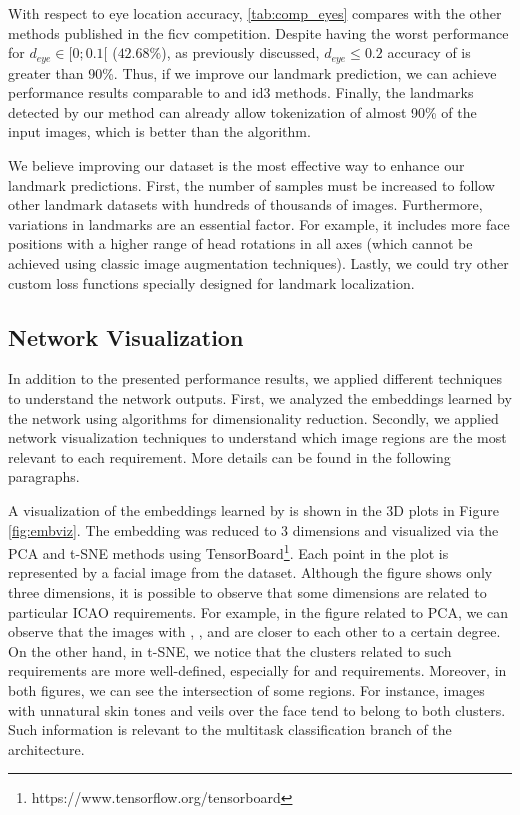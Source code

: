 With respect to eye location accuracy, \autoref{tab:comp_eyes} compares \methodname with the other methods published in the \acs{ficv} competition. Despite having the worst performance for $d_{eye} \in [0;0.1[$ ($42.68\%$), as previously discussed, $d_{eye} \leq 0.2$ accuracy of \methodname is greater than 90\%. Thus, if we improve our landmark prediction, we can achieve performance results comparable to \biopass and id3 methods. Finally, the landmarks detected by our method can already allow tokenization of almost 90\% of the input images, which is better than the \biotest algorithm.
 
We believe improving our dataset is the most effective way to enhance our landmark predictions. First, the number of samples must be increased to follow other landmark datasets with hundreds of thousands of images. Furthermore, variations in landmarks are an essential factor. For example, it includes more face positions with a higher range of head rotations in all axes (which cannot be achieved using classic image augmentation techniques). Lastly, we could try other custom loss functions specially designed for landmark localization.
 

 
\subsection{Network Visualization} \label{sec:netviz}
 
In addition to the presented performance results, we applied different techniques to understand the network outputs. First, we analyzed the embeddings learned by the network using algorithms for dimensionality reduction. Secondly, we applied network visualization techniques to understand which image regions are the most relevant to each requirement. More details can be found in the following paragraphs.
 
A visualization of the embeddings learned by \methodname is shown in the 3D plots in Figure \ref{fig:embviz}. The embedding was reduced to 3 dimensions and visualized via the PCA and t-SNE methods using TensorBoard\footnote{https://www.tensorflow.org/tensorboard}. Each point in the plot is represented by a facial image from the dataset. Although the figure shows only three dimensions, it is possible to observe that some dimensions are related to particular ICAO requirements. For example, in the figure related to PCA, we can observe that the images with \variedbackground, \unnaturalskintone, and \veiloverface are closer to each other to a certain degree. On the other hand, in t-SNE, we notice that the clusters related to such requirements are more well-defined, especially for \variedbackground and \veiloverface requirements. Moreover, in both figures, we can see the intersection of some regions. For instance, images with unnatural skin tones and veils over the face tend to belong to both clusters. Such information is relevant to the multitask classification branch of the \methodname architecture. 
 

